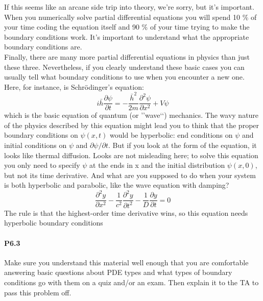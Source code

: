 If this seems like an arcane side trip into theory, we\rq re sorry, but it\rq s important.
When you numerically solve partial differential equations you will spend 10 \%
of your time coding the equation itself and 90 \% of your time trying to make the
boundary conditions work. It\rq s important to understand what the appropriate
boundary conditions are. \\
Finally, there are many more partial differential equations in physics than
just these three. Nevertheless, if you clearly understand these basic cases you
can usually tell what boundary conditions to use when you encounter a new one.
Here, for instance, is Schr{\"o}dinger\rq s equation:
\begin{equation}\label{eq:615}
i \bar{h} \frac{\partial \psi}{\partial t}=-\frac{\bar{h}^{2}}{2 m} \frac{\partial^{2} \psi}{\partial x^{2}} + V \psi
\end{equation}
which is the basic equation of quantum (or \rq\rq wave\lq\lq) mechanics. The wavy nature
of the physics described by this equation might lead you to think that the proper
boundary conditions on $\psi (x,t)$ would be hyperbolic: end conditions on $\psi$ and initial conditions on $\psi$ and $\partial \psi / \partial t$. But if you look at the form of the equation, it
looks like thermal diffusion. Looks are not misleading here; to solve this equation
you only need to specify $\psi$ at the ends in x and the initial distribution $ \psi(x,0)$, but
not its time derivative. And what are you supposed to do when your system is both hyperbolic and
parabolic, like the wave equation with damping?
\begin{equation}\label{eq:616}
\frac{\partial^{2} y}{\partial x^{2}}-\frac{1}{c^{2}} \frac{\partial^{2} y}{\partial t^{2}}-\frac{1}{D} \frac{\partial y}{\partial t}=0
\end{equation}
The rule is that the highest-order time derivative wins, so this equation needs
hyperbolic boundary conditions
\paragraph*{P6.3} Make sure you understand this material well enough that you are comfortable answering basic questions about PDE types and what types of
boundary conditions go with them on a quiz and/or an exam. Then explain
it to the TA to pass this problem off.

